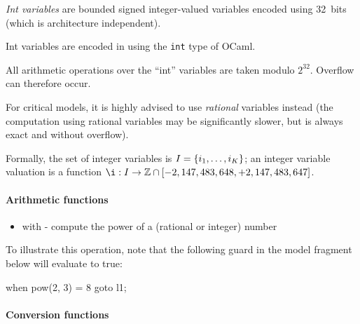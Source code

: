 \emph{Int variables} are bounded signed integer-valued variables encoded using 32~bits (which is architecture independent).

Int variables are encoded in \imitator{} using the \texttt{int} type of OCaml.

\begin{becareful}
	All arithmetic operations over the ``int'' variables are taken modulo $2^{32}$.
	Overflow can therefore occur.

	For critical models, it is highly advised to use \emph{rational} variables instead (the computation using rational variables may be significantly slower, but is always exact and without overflow).
\end{becareful}

Formally, the set of integer variables is $I = \{ i_1, \dots, i_K \} $;
an integer variable valuation is a function $\ival : \IVar \rightarrow \setZ \cap \left[-2,147,483,648, +2,147,483,647\right]$.



\paragraph{Arithmetic functions}

\begin{itemize}
    \item \label{item:lbl-pow}  with  - compute the power of a (rational or integer) number
\end{itemize}

\begin{example}
	To illustrate this operation, note that the following guard in the model fragment below will evaluate to true:

	\begin{IMITATORmodel}
		when pow(2, 3) = 8 goto l1;
	\end{IMITATORmodel}
\end{example}

\paragraph{Conversion functions}

